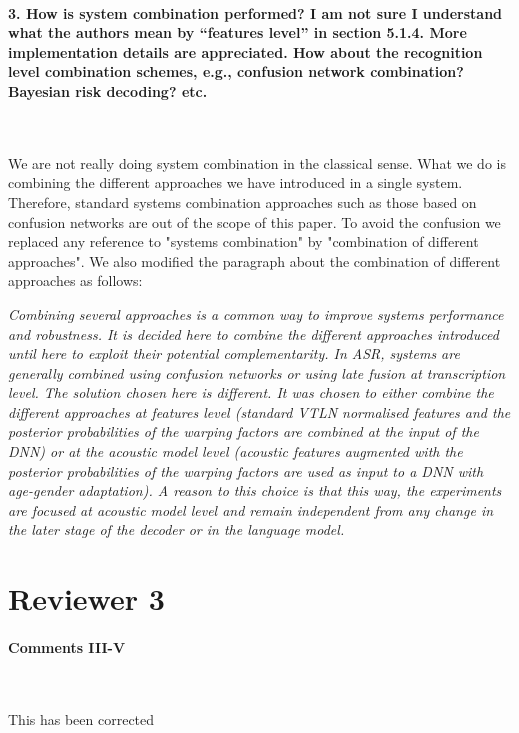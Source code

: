 \documentclass[]{article}
\begin{document}
\paragraph{3. How is system combination performed? I am not sure I understand what the authors mean by “features level” in section 5.1.4. More implementation details are appreciated. How about the recognition level combination schemes, e.g., confusion network combination? Bayesian risk decoding? etc.}

~

We are not really doing system combination in the classical sense. What we do is combining the different approaches we have introduced in a single system. Therefore, standard systems combination approaches such as those based on confusion networks are out of the scope of this paper. To avoid the confusion we replaced any reference to "systems combination" by "combination of different approaches". We also modified the paragraph about the combination of different approaches as follows:

\textit{Combining several approaches is a common way to improve systems performance and robustness. It is decided here to combine the different approaches introduced until here to exploit their potential complementarity. In ASR, systems are generally combined using confusion networks or using late fusion at transcription level. The solution chosen here is different. It was chosen to either combine the different approaches at features level (standard VTLN normalised features and the posterior probabilities of the warping factors are combined at the input of the DNN) or at the acoustic model level (acoustic features augmented with the posterior probabilities of the warping factors are used as input to a DNN with age-gender adaptation). A reason to this choice is that this way, the experiments are focused at acoustic model level and remain independent from any change in the later stage of the decoder or in the language model.}



\section{Reviewer 3}

\paragraph{Comments III-V}

~

This has been corrected
\end{document}
